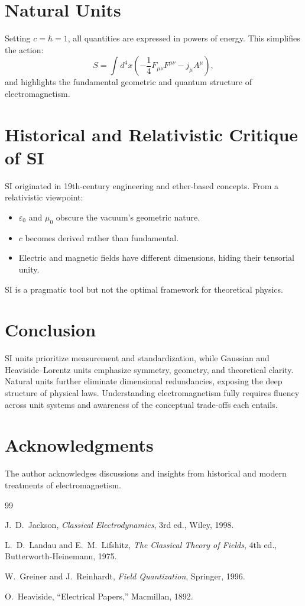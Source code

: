\documentclass[aps,prd,preprint,superscriptaddress,nofootinbib]{revtex4-2}
\begin{document}
\section{Natural Units}

Setting $c = \hbar = 1$, all quantities are expressed in powers of energy. This simplifies the action:
\[
S = \int d^4x \left( -\frac{1}{4} F_{\mu\nu}F^{\mu\nu} - j_\mu A^\mu \right),
\]
and highlights the fundamental geometric and quantum structure of electromagnetism.

\section{Historical and Relativistic Critique of SI}

SI originated in 19th-century engineering and ether-based concepts. From a relativistic viewpoint:

\begin{itemize}
\item $\varepsilon_0$ and $\mu_0$ obscure the vacuum's geometric nature.
\item $c$ becomes derived rather than fundamental.
\item Electric and magnetic fields have different dimensions, hiding their tensorial unity.
\end{itemize}

SI is a pragmatic tool but not the optimal framework for theoretical physics.

\section{Conclusion}

SI units prioritize measurement and standardization, while Gaussian and Heaviside--Lorentz units emphasize symmetry, geometry, and theoretical clarity. Natural units further eliminate dimensional redundancies, exposing the deep structure of physical laws. Understanding electromagnetism fully requires fluency across unit systems and awareness of the conceptual trade-offs each entails.

\section*{Acknowledgments}

The author acknowledges discussions and insights from historical and modern treatments of electromagnetism.

\begin{thebibliography}{99}

J.~D.~Jackson, \textit{Classical Electrodynamics}, 3rd ed., Wiley, 1998.

L.~D.~Landau and E.~M.~Lifshitz, \textit{The Classical Theory of Fields}, 4th ed., Butterworth-Heinemann, 1975.

W.~Greiner and J.~Reinhardt, \textit{Field Quantization}, Springer, 1996.

O.~Heaviside, ``Electrical Papers,'' Macmillan, 1892.

\end{thebibliography}
\end{document}

